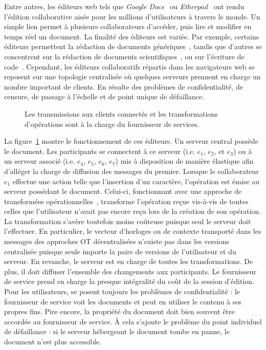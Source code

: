 Entre autres, les éditeurs web tels que \emph{Google Docs}~\cite{googledocs} ou
\emph{Etherpad}~\cite{etherpad} ont rendu l'édition collaborative aisée pour les
millions d'utilisateurs à travers le monde. Un simple lien permet à plusieurs
collaborateurs d'accéder, puis lire et modifier en temps réel un document. La
finalité des éditeurs est variée. Par exemple, certains éditeurs permettent la
rédaction de documents génériques~\cite{etherpad, googledocs, googlewave,
  hivejs}, tandis que d'autres se concentrent sur la rédaction de documents
scientifiques~\cite{authorea, overleaf, sharelatex, fidus}, ou sur l'écriture de
code~\cite{lautamaki2012cored, hyperdev}.  Cependant, les éditeurs collaboratifs
répartis dans les navigateurs web se reposent sur une topologie centralisée où
quelques serveurs prennent en charge un nombre important de clients. En résulte
des problèmes de confidentialité, de censure, de passage à l'échelle et de point
unique de défaillance.



\begin{figure}
  \begin{center}
    
    \caption[Fonctionnement des éditeurs centralisés]
    {\label{editor:fig:serviceprovider} Les transmissions aux clients connectés
      et les transformations d'opérations sont à la charge du fournisseur de
      services.}
  \end{center}
\end{figure}

La figure~\ref{editor:fig:serviceprovider} montre le fonctionnement de ces
éditeurs. Un serveur central possède le document. Les participants se connectent
à ce serveur (i.e. $e_1$, $e_2$, et $e_3$) ou à un serveur associé (i.e. $e_4$,
$e_5$, $e_6$, $e_7$) mis à disposition de manière élastique afin d'alléger la
charge de diffusion des messages du premier. Lorsque le collaborateur $e_1$
effectue une action telle que l'insertion d'un caractère, l'opération est émise
au serveur possédant le document. Celui-ci, fonctionnant avec une approche de
transformées opérationnelles~\cite{nichols1995high}, transforme l'opération
reçue vis-à-vis de toutes celles que l'utilisateur n'avait pas encore reçu lors
de la création de son opération. La transformation s'avère toutefois moins
coûteuse puisque seul le serveur doit l'effectuer. En particulier, le vecteur
d'horloges ou de contexte transporté dans les messages des approches OT
décentralisées n'existe pas dans les versions centralisée puisque seule importe
la paire de versions de l'utilisateur et du serveur. En revanche, le serveur est
en charge de toutes les transformations. De plus, il doit diffuser l'ensemble
des changements aux participants. Le fournisseur de service prend en charge la
presque intégralité du coût de la session d'édition. Pour les utilisateurs, se
posent toujours les problèmes de confidentialité : le fournisseur de service
voit les documents et peut en utiliser le contenu à ses propres fins. Pire
encore, la propriété du document doit bien souvent être accordée au fournisseur
de service. À cela s'ajoute le problème du point individuel de défaillance : si
le serveur hébergeant le document tombe en panne, le document n'est plus
accessible.

